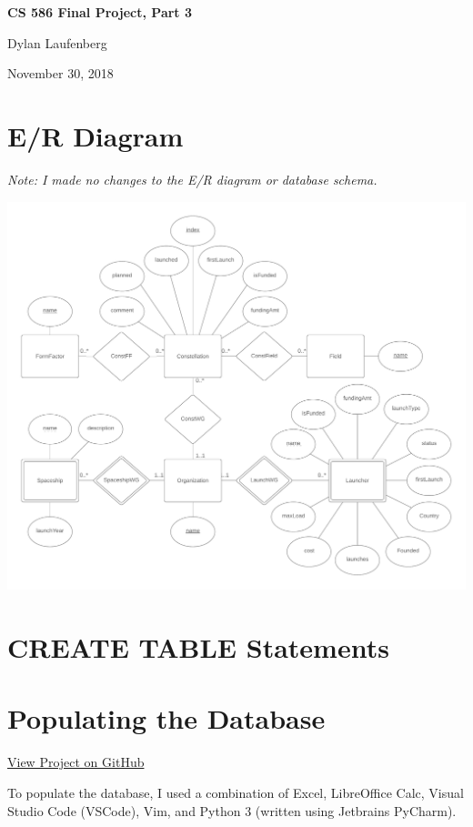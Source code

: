 \documentclass{article}
\begin{document}
\begin{center}
    \Huge
    \textbf{CS 586 Final Project, Part 3}
    
    \Large
    Dylan Laufenberg
    
    \normalsize
    November 30, 2018
\end{center}

\tableofcontents


\section{E/R Diagram}

\textit{Note: I made no changes to the E/R diagram or database schema.}

\includegraphics[width=\textwidth]{er-diagram}

\section{CREATE TABLE Statements}


\section{Populating the Database}
\href{https://github.com/edev/CS586FinalProject}{View Project on GitHub}

To populate the database, I used a combination of Excel, LibreOffice Calc, Visual Studio Code (VSCode), Vim, and Python 3 (written using Jetbrains PyCharm).
\end{document}
